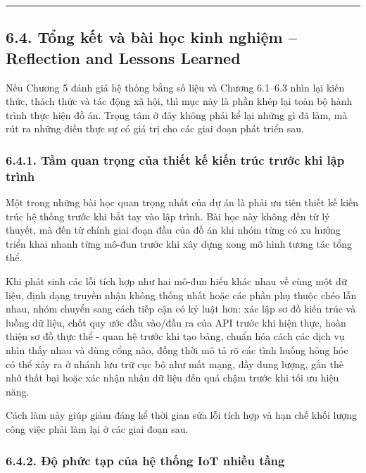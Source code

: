 \documentclass[a4paper]{extarticle}
\begin{document}
\begin{center}\rule{0.5\linewidth}{0.5pt}\end{center}

\subsection{6.4. Tổng kết và bài học kinh nghiệm -- Reflection and Lessons Learned}\label{64-tux1ed5ng-kux1ebft-vuxe0-buxe0i-hux1ecdc-kinh-nghiux1ec7m--reflection-and-lessons-learned}

Nếu Chương 5 đánh giá hệ thống bằng số liệu và Chương 6.1--6.3 nhìn lại
kiến thức, thách thức và tác động xã hội, thì mục này là phần khép lại
toàn bộ hành trình thực hiện đồ án. Trọng tâm ở đây không phải kể lại
những gì đã làm, mà rút ra những điều thực sự có giá trị cho các giai
đoạn phát triển sau.

\subsubsection{6.4.1. Tầm quan trọng của thiết kế kiến trúc trước khi
lập
trình}\label{641-tux1ea7m-quan-trux1ecdng-cux1ee7a-thiux1ebft-kux1ebf-kiux1ebfn-truxfac-trux1b0ux1edbc-khi-lux1eadp-truxecnh}

Một trong những bài học quan trọng nhất của dự án là phải ưu tiên thiết
kế kiến trúc hệ thống trước khi bắt tay vào lập trình. Bài học này không
đến từ lý thuyết, mà đến từ chính giai đoạn đầu của đồ án khi nhóm từng
có xu hướng triển khai nhanh từng mô-đun trước khi xây dựng xong mô hình
tương tác tổng thể.

Khi phát sinh các lỗi tích hợp như hai mô-đun hiểu khác nhau về cùng một
dữ liệu, định dạng truyền nhận không thống nhất hoặc các phần phụ thuộc
chéo lẫn nhau, nhóm chuyển sang cách tiếp cận có kỷ luật hơn: xác lập sơ
đồ kiến trúc và luồng dữ liệu, chốt quy ước đầu vào/đầu ra của API trước
khi hiện thực, hoàn thiện sơ đồ thực thể - quan hệ trước khi tạo bảng,
chuẩn hóa cách các dịch vụ nhìn thấy nhau và dùng cổng nào, đồng thời mô
tả rõ các tình huống hỏng hóc có thể xảy ra ở nhánh lưu trữ cục bộ như
mất mạng, đầy dung lượng, gắn thẻ nhớ thất bại hoặc xác nhận nhận dữ
liệu đến quá chậm trước khi tối ưu hiệu năng.

Cách làm này giúp giảm đáng kể thời gian sửa lỗi tích hợp và hạn chế
khối lượng công việc phải làm lại ở các giai đoạn sau.

\subsubsection{6.4.2. Độ phức tạp của hệ thống IoT nhiều
tầng}\label{642-ux111ux1ed9-phux1ee9c-tux1ea1p-cux1ee7a-hux1ec7-thux1ed1ng-iot-nhiux1ec1u-tux1ea7ng}
\end{document}
